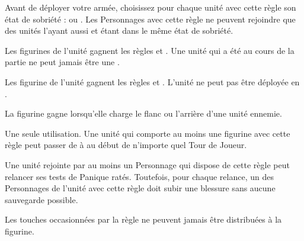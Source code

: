 Avant de déployer votre armée, choisissez pour chaque unité avec cette règle son état de sobriété : \sober{} ou \drunk{}. Les Personnages avec cette règle ne peuvent rejoindre que des unités l'ayant aussi et étant dans le même état de sobriété.
\begin{multicols}{2}
	\raggedcolumns
	\begin{center}{\Largerfontsize\antiquefont\sober{}}\end{center}
	\vspace{5pt}
	\textit{}\vspace{3pt}\newline
	Les figurines de l'unité gagnent les règles \vanguard{} et \lighttroops{}. Une unité qui a été \sober{} au cours de la partie ne peut jamais être une \scoringunit{}.

	\vspace*{\fill}
	\columnbreak
	\begin{center}{\Largerfontsize\antiquefont\drunk{}}\end{center}
	\vspace{5pt}
	\textit{}\vspace{3pt}\newline
	Les figurine de l'unité gagnent les règles \thunderouscharge{} et \immunetopsychology{}. L'unité ne peut pas être déployée en \ambush{}.

	\vspace*{\fill}
\end{multicols}

\armyspecialruleentry{\packtactics}

La figurine gagne \swiftstride{} lorsqu'elle charge le flanc ou l'arrière d'une unité ennemie.

\armyspecialruleentry{\lootedbooze}

Une seule utilisation. Une unité qui comporte au moins une figurine avec cette règle peut passer de \sober{} à \drunk{} au début de n'importe quel Tour de Joueur.

\armyspecialruleentry{\bloodoffering}

Une unité rejointe par au moins un Personnage qui dispose de cette règle peut relancer ses tests de Panique ratés. Toutefois, pour chaque relance, un des Personnages de l'unité avec cette règle doit subir une blessure sans aucune sauvegarde possible.

\armyspecialruleentry{\halfhorse}

Les touches occasionnées par la règle \stomp{} ne peuvent jamais être distribuées à la figurine.

